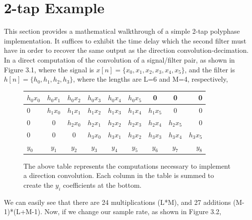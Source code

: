 \documentclass{report}
\begin{document}
\section{2-tap Example}
This section provides a mathematical walkthrough of a simple 2-tap polyphase implementation.  It suffices to exhibit the time delay which the second filter must have in order to recover the same output as the direction convolution-decimation. 
In a direct computation of the convolution of a signal/filter pair, as shown in Figure 3.1, where the signal is $x[n] = \{x_0, x_1, x_2, x_3, x_4, x_5\}$, and the filter is $h[n] = \{h_0, h_1, h_2, h_3\}$, where the lengths are L=6 and M=4, respectively,
\bigskip
\begin{figure}[ht]
\begin{center}
  \begin{tabular}{ l|c|c|c|c|c|c|c|r }
    \hline
    $h_0 x_0$ & $h_0 x_1$ & $h_0 x_2$ & $h_0 x_3$ & $h_0 x_4$ & $h_0 x_5$ & 0 & 0 & 0\\ \hline
    0 & $h_1 x_0$ & $h_1 x_1$ & $h_1 x_2$ & $h_1 x_3$ & $h_1 x_4$ & $h_1 x_5$ & 0 & 0\\ \hline
    0 & 0 &$h_2 x_0$ & $h_2 x_1$ & $h_2 x_2$ & $h_2 x_3$ & $h_2 x_4$ & $h_2 x_5$ & 0\\ \hline
    0 & 0 & 0 &$h_3 x_0$ & $h_3 x_1$ & $h_3 x_2$ & $h_3 x_3$ & $h_3 x_4$ & $h_3 x_5$ \\\Xhline{1pt}
    $y_0$ & $y_1$ & $y_2$ & $y_3$ & $y_4$ & $y_5$ & $y_6$ & $y_7$ & $y_8$\\ \hline
  \end{tabular}
\end{center}
\caption{The above table represents the computations necessary to implement a direction convolution.  Each column in the table is summed to create the $y_i$ coefficients at the bottom.}
\end{figure}


We can easily see that there are 24 multiplications (L*M), and 27 additions (M-1)*(L+M-1).  Now, if we change our sample rate, as shown in Figure 3.2, 
\end{document}
